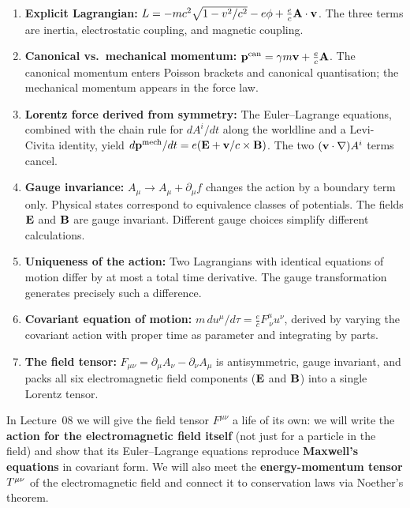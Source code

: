 \begin{enumerate}
    \item \textbf{Explicit Lagrangian:}
      $L = -mc^2\sqrt{1-v^2/c^2} - e\phi + \tfrac{e}{c}\mathbf{A}\cdot\mathbf{v}$.
      The three terms are inertia, electrostatic coupling, and magnetic coupling.

    \item \textbf{Canonical vs.\ mechanical momentum:}
      $\mathbf{p}^{\text{can}} = \gamma m\mathbf{v} + \tfrac{e}{c}\mathbf{A}$.
      The canonical momentum enters Poisson brackets and canonical quantisation;
      the mechanical momentum appears in the force law.

    \item \textbf{Lorentz force derived from symmetry:}
      The Euler--Lagrange equations, combined with the chain rule for
      $dA^i/dt$ along the worldline and a Levi-Civita identity, yield
      $d\mathbf{p}^{\text{mech}}/dt = e(\mathbf{E} + \mathbf{v}/c\times\mathbf{B})$.
      The two $(\mathbf{v}\cdot\nabla)A^i$ terms cancel.

    \item \textbf{Gauge invariance:} $A_\mu \to A_\mu + \partial_\mu f$ changes
      the action by a boundary term only.  Physical states correspond to
      equivalence classes of potentials.  The fields $\mathbf{E}$ and $\mathbf{B}$ are gauge
      invariant.  Different gauge choices simplify different calculations.

    \item \textbf{Uniqueness of the action:} Two Lagrangians with identical
      equations of motion differ by at most a total time derivative.  The gauge
      transformation generates precisely such a difference.

    \item \textbf{Covariant equation of motion:}
      $m\,du^\mu/d\tau = \tfrac{e}{c}F^{\mu}_{\ \nu}u^\nu$,
      derived by varying the covariant action with proper time as parameter
      and integrating by parts.

    \item \textbf{The field tensor:} $F_{\mu\nu} = \partial_\mu A_\nu - \partial_\nu A_\mu$
      is antisymmetric, gauge invariant, and packs all six electromagnetic
      field components ($\mathbf{E}$ and $\mathbf{B}$) into a single Lorentz tensor.

\end{enumerate}

In Lecture~08 we will give the field tensor $F^{\mu\nu}$ a life of its own:
we will write the \textbf{action for the electromagnetic field itself} (not
just for a particle in the field) and show that its Euler--Lagrange equations
reproduce \textbf{Maxwell's equations} in covariant form.  We will also meet
the \textbf{energy-momentum tensor} $T^{\mu\nu}$ of the electromagnetic field
and connect it to conservation laws via Noether's theorem.
